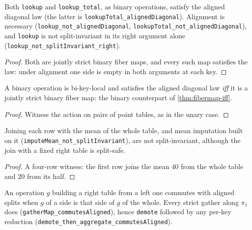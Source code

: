 \begin{theorem}
  \label{thm:join-aligned-diagonal}
  \leanok
  Both \texttt{lookup} and \texttt{lookup\_total}, as binary operations,
  satisfy the aligned diagonal law (the latter is
  \texttt{lookupTotal\_alignedDiagonal}).  Alignment is necessary
  (\texttt{lookup\_not\_alignedDiagonal},
  \texttt{lookupTotal\_not\_alignedDiagonal}), and \texttt{lookup} is not
  split-invariant in its right argument alone
  (\texttt{lookup\_not\_splitInvariant\_right}).
\end{theorem}
\begin{proof}\leanok
  Both are jointly strict binary fiber maps, and every such map
  satisfies the law: under alignment one side is empty in both arguments
  at each key.
\end{proof}

\begin{theorem}
  \label{thm:binary-safe-completeness}
  \leanok
  A binary operation is bi-key-local and satisfies the aligned diagonal
  law \emph{iff} it is a jointly strict binary fiber map: the binary
  counterpart of \ref{thm:fibermap-iff}.
\end{theorem}
\begin{proof}\leanok
  Witness the action on pairs of point tables, as in the unary case.
\end{proof}

\begin{theorem}
  \label{thm:joinmean-not-splitinvariant}
  \leanok
  Joining each row with the mean of the whole table, and mean imputation
  built on it (\texttt{imputeMean\_not\_splitInvariant}), are not
  split-invariant, although the join with a fixed right table is
  split-safe.
\end{theorem}
\begin{proof}\leanok
  A four-row witness: the first row joins the mean $40$ from the whole
  table and $20$ from its half.
\end{proof}

\begin{definition}
  \label{def:commutes-aligned}\leanok
  An operation $g$ building a right table from a left one commutes with
  aligned splits when $g$ of a side is that side of $g$ of the whole.
  Every strict gather along $\pi_1$ does
  (\texttt{gatherMap\_commutesAligned}), hence \texttt{demote} followed by
  any per-key reduction (\texttt{demote\_then\_aggregate\_commutesAligned}).
\end{definition}

